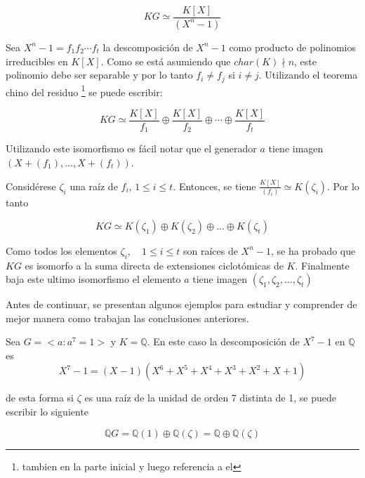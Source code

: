 \[KG \simeq \frac{K[X]}{(X^n -1 )} \]

Sea $ X^n -1 = f_1f_2\cdots f_t$ la descomposición de $X^n -1$ como producto de polinomios irreducibles en $K[X]$. Como se está asumiendo que $char(K) \nmid n$, este polinomio debe ser separable y por lo tanto $f_i \neq f_j$ si $i \neq j$. Utilizando el teorema chino del residuo \footnote{tambien en la parte inicial y luego referencia a el} se puede escribir:

\[KG \simeq \frac{K[X]}{f_1} \oplus \frac{K[X]}{f_2} \oplus \cdots \oplus \frac{K[X]}{f_t} \]


Utilizando este isomorfismo es fácil notar que el generador $a$ tiene imagen $( X + (f_1)  , \dots, X + (f_t) ) $. 

Considérese $\zeta_i$ una raíz de $f_i$, $1 \leq i \leq t$. Entonces, se tiene $\frac{K[X]}{(f_i)} \simeq K(\zeta_i)$. Por lo tanto

\[ KG \simeq K(\zeta_1) \oplus K(\zeta_2) \oplus \dots \oplus K(\zeta_t)  \]

Como todos los elementos $\zeta_i , \quad 1 \leq i \leq t$ son raíces de $X^n -1$, se ha probado que $KG$ es isomorfo a la suma directa de extensiones ciclotómicas de $K$. Finalmente baja este 
ultimo isomorfismo el elemento $a$ tiene imagen $(\zeta_1 , \zeta_2, \dots ,\zeta_t)$

Antes de continuar, se presentan algunos ejemplos para estudiar y comprender de mejor manera como trabajan las conclusiones anteriores.

\begin{ejemplo}\label{ejem:orden7}
Sea $G = < a \colon a^7 = 1>$ y $K = \mathds{Q} $. 
En este caso la descomposición de $ X^7 -1$ en $\mathds{Q}$ es 
\[ X^7 -1 = (X-1)(X^6 + X^5 + X^4 + X^3 + X^2 + X + 1) \]

de esta forma si $\zeta$ es una raíz de la unidad de orden 7 distinta de 1, se puede escribir lo siguiente

\[  \mathds{Q}G = \mathds{Q}(1) \oplus \mathds{Q}(\zeta) = \mathds{Q} \oplus \mathds{Q}(\zeta)   \]
\end{ejemplo}

